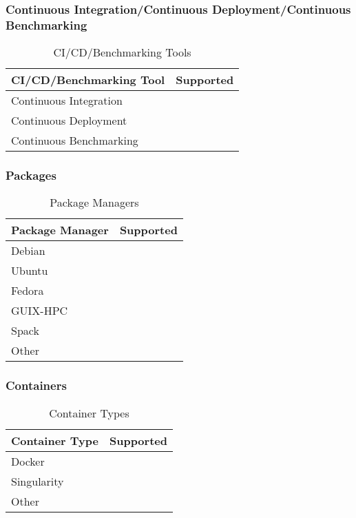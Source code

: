 \subsubsection{Continuous Integration/Continuous Deployment/Continuous Benchmarking}
\begin{table}[h!]
    \centering
    \begin{tabular}{|l|c|}
        \hline
        CI/CD/Benchmarking Tool & Supported \\
        \hline
        Continuous Integration &  \\
        Continuous Deployment &  \\
        Continuous Benchmarking &  \\
        \hline
    \end{tabular}
    \caption{CI/CD/Benchmarking Tools}
\end{table}

\subsubsection{Packages}
\begin{table}[h!]
    \centering
    \begin{tabular}{|l|c|}
        \hline
        Package Manager & Supported \\
        \hline
        Debian &  \\
        Ubuntu &  \\
        Fedora &  \\
        GUIX-HPC &  \\
        Spack &  \\
        Other &  \\
        \hline
    \end{tabular}
    \caption{Package Managers}
\end{table}

\subsubsection{Containers}
\begin{table}[h!]
    \centering
    \begin{tabular}{|l|c|}
        \hline
        Container Type & Supported \\
        \hline
        Docker &  \\
        Singularity &  \\
        Other &  \\
        \hline
    \end{tabular}
    \caption{Container Types}
\end{table}

